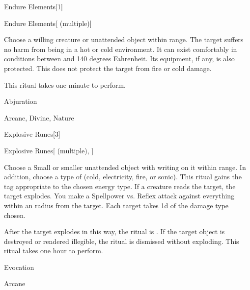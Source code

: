 \begin{spellsection}{Endure Elements}[1]


\begin{ability}{Endure Elements}[ (multiple)]

Choose a willing creature or unattended object within \rngclose range.
The target suffers no harm from being in a hot or cold environment.
It can exist comfortably in conditions between  and 140 degrees Fahrenheit.
Its equipment, if any, is also protected.
This does not protect the target from fire or cold damage.

This ritual takes one minute to perform.

\end{ability}




 Abjuration

 Arcane, Divine, Nature
\end{spellsection}


\begin{spellsection}{Explosive Runes}[3]


\begin{ability}{Explosive Runes}[ (multiple), ]

Choose a Small or smaller unattended object with writing on it within \rngclose range.
In addition, choose a type of  (cold, electricity, fire, or sonic).
This ritual gains the tag appropriate to the chosen energy type.
If a creature reads the target, the target explodes.
You make a Spellpower vs. Reflex attack against everything within an \areamed radius from the target.
\hit Each target takes  \minus1d of the damage type chosen.

After the target explodes in this way, the ritual is .
If the target object is destroyed or rendered illegible, the ritual is dismissed without exploding.
This ritual takes one hour to perform.

\end{ability}




 Evocation

 Arcane
\end{spellsection}


